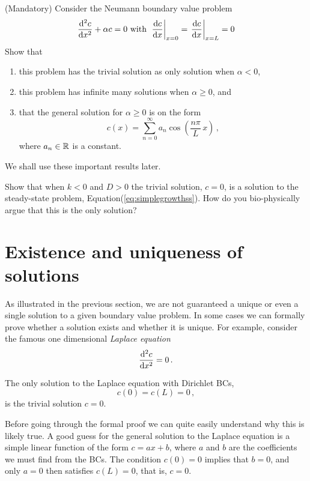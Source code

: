 \begin{exerciseregion}
	\begin{exercise}
		\label{exercise:ststneumann}
		(Mandatory) Consider the Neumann boundary value problem
		\begin{eqnarray}
			\frac{\mathrm{d}^2c}{\mathrm{d} x^2} + \alpha c = 0 \ \text{with} \  \left.\frac{\mathrm{d} c}{\mathrm{d} x}\right|_{x=0} = \left.\frac{\mathrm{d} c}{\mathrm{d} x}\right|_{x=L} =0
		\end{eqnarray}
		Show that   
		\begin{enumerate}
			\item this problem has the trivial solution as only solution when $\alpha < 0$, 
			\item this problem has infinite many solutions when $\alpha \geq 0$, and
			\item that the general solution for $\alpha \geq 0$ is on the form
			\begin{equation}
				\label{eq:2ndorderseriescosine}	
				c(x) = \sum_{n=0}^\infty a_n \cos\left(\frac{n\pi}{L} \, x \right) \, ,
			\end{equation}
			where $a_n \in \mathbb{R}$ is a constant.
		\end{enumerate}
		 We shall use these important results later. 
	\end{exercise}
	\begin{exercise}
	  Show that when $k<0$ and $D>0$ the trivial solution, $c=0$, is a solution to the steady-state
	  problem, Equation(\ref{eq:simplegrowthss}). How do you bio-physically argue that
		this is the only solution?
	\end{exercise}

\end{exerciseregion}


\section{Existence and uniqueness of solutions} \label{sect:uniq}
As illustrated in the previous section, we are not guaranteed a unique or even a single solution 
to a given boundary value problem. In some cases we can formally prove whether a solution exists and
whether it is unique. For example, consider the famous one dimensional \emph{Laplace equation}
\begin{equation}
  \label{eq:laplace}
  \frac{\mathrm{d}^2 c}{\mathrm{d} x^2} =  0 \, . 
\end{equation}
 
\begin{theorem}
  The only solution to the Laplace equation with Dirichlet BCs, 
  \begin{equation} 
    c(0) = c(L)=0 \, ,
  \end{equation}
  is the trivial solution $c=0$.
\end{theorem}
Before going through the formal proof we can quite easily understand why
this is likely true. A good guess for the general solution to the Laplace equation is a
simple linear function of the form $c = ax + b$, where $a$ and $b$
are the coefficients we must find from the BCs. The condition $c(0) = 0$ implies that $b=0$,
and only $a=0$ then satisfies $c(L) = 0$, that is, $c=0$.

